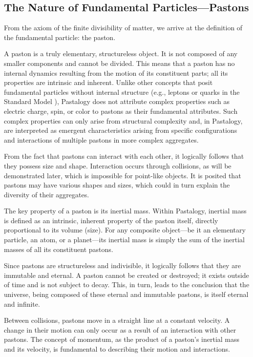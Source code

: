 \documentclass[pdflatex,sn-mathphys-num]{sn-jnl}
\begin{document}
\subsection{The Nature of Fundamental Particles---Pastons}\label{subsec:pastons}

From the axiom of the finite divisibility of matter, we arrive at the definition of the fundamental particle: the paston.

A paston is a truly elementary, structureless object. It is not composed of any smaller components and cannot be divided. This means that a paston has no internal dynamics resulting from the motion of its constituent parts; all its properties are intrinsic and inherent. Unlike other concepts that posit fundamental particles without internal structure (e.g., leptons or quarks in the Standard Model \cite{pdg2024}), Pastalogy does not attribute complex properties such as electric charge, spin, or color to pastons as their fundamental attributes. Such complex properties can only arise from structural complexity and, in Pastalogy, are interpreted as emergent characteristics arising from specific configurations and interactions of multiple pastons in more complex aggregates.

From the fact that pastons can interact with each other, it logically follows that they possess size and shape. Interaction occurs through collisions, as will be demonstrated later, which is impossible for point-like objects. It is posited that pastons may have various shapes and sizes, which could in turn explain the diversity of their aggregates.

The key property of a paston is its inertial mass. Within Pastalogy, inertial mass is defined as an intrinsic, inherent property of the paston itself, directly proportional to its volume (size). For any composite object---be it an elementary particle, an atom, or a planet---its inertial mass is simply the sum of the inertial masses of all its constituent pastons.

Since pastons are structureless and indivisible, it logically follows that they are immutable and eternal. A paston cannot be created or destroyed; it exists outside of time and is not subject to decay. This, in turn, leads to the conclusion that the universe, being composed of these eternal and immutable pastons, is itself eternal and infinite.

Between collisions, pastons move in a straight line at a constant velocity. A change in their motion can only occur as a result of an interaction with other pastons. The concept of momentum, as the product of a paston's inertial mass and its velocity, is fundamental to describing their motion and interactions.
\end{document}

